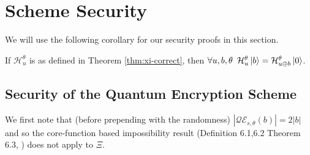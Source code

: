 \section{Scheme Security}
\label{sec:security}

We will use the following corollary for our security proofs in this section.
\begin{corollary}
\label{cor:h-zero}
If $\mathcal{H}^\theta_u$ is as defined in Theorem \ref{thm:xi-correct}, then $\forall u,b,\theta \hspace*{5pt} \mathcal{H}^\theta_u\ket{b} = \mathcal{H}^\theta_{u \oplus b}\ket{0}$.
\end{corollary}

\subsection{Security of the Quantum Encryption Scheme}
\label{sec:quan-sec}

We first note that (before prepending with the randomness) $|\mathcal{QE}_{s,\theta}(b)| = 2|b|$ and so the core-function based impossibility result (Definition 6.1,6.2 Theorem 6.3, \cite{semsec}) does not apply to $\Xi$.

